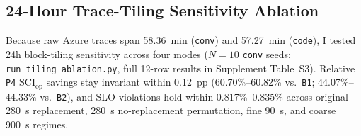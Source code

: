 \subsection{24-Hour Trace-Tiling Sensitivity Ablation}\label{subsec:tiling_ablation}
Because raw Azure traces span 58.36~min (\texttt{conv}) and 57.27~min (\texttt{code}), I tested 24h block-tiling sensitivity across four modes ($N=10$ \texttt{conv} seeds; \texttt{run\_tiling\_ablation.py}, full 12-row results in Supplement Table~S3). Relative \texttt{P4} $\text{SCI}_{\text{op}}$ savings stay invariant within 0.12~pp (60.70\%--60.82\% vs.\ \texttt{B1}; 44.07\%--44.33\% vs.\ \texttt{B2}), and SLO violations hold within 0.817\%--0.835\% across original 280~s replacement, 280~s no-replacement permutation, fine 90~s, and coarse 900~s regimes.
